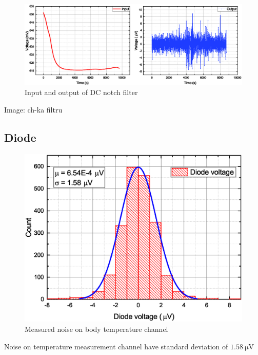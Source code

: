     \begin{figure}[H]
        \centering
        \includegraphics[width=0.8\paperwidth]{img/07/filterBeforeAfter.eps}
        \caption{Input and output of DC notch filter}
        \label{notch_DC_example}
    \end{figure}

    Image: ch-ka filtru

    \subsection{Diode}
        \begin{figure}[H]
            \centering
            \includegraphics[width=0.8\paperwidth]{img/07/diodeVoltage.eps}
            \caption{Measured noise on body temperature channel}
        \end{figure}

        Noise on temperature measurement channel have standard deviation of $\SI{1.58}{\uV}$
